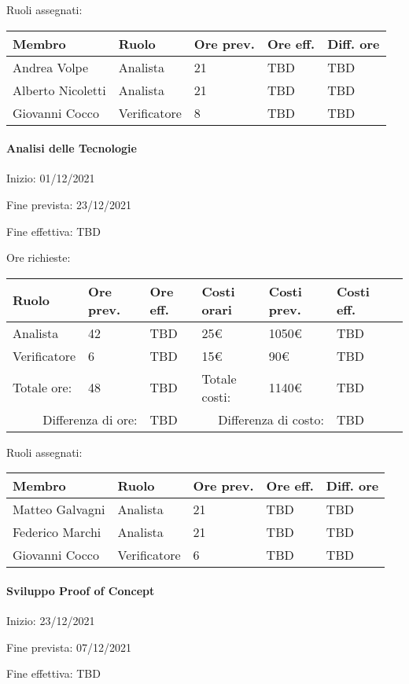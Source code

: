 \documentclass[a4paper, 12pt]{article}
\begin{document}
Ruoli assegnati:\\[0.5em]
\begin{tabular}{|l|l|l|l|l|}\hline
Membro & Ruolo & Ore prev. & Ore eff. & Diff. ore \\\hline
Andrea Volpe & Analista & 21 & TBD & TBD \\\hline
Alberto Nicoletti & Analista & 21 & TBD & TBD \\\hline
Giovanni Cocco & Verificatore & 8 & TBD & TBD \\\hline
\end{tabular}

\paragraph{Analisi delle Tecnologie}
Inizio: 01/12/2021\par
Fine prevista: 23/12/2021\par
Fine effettiva: TBD

Ore richieste:\\[0.5em]
\begin{tabular}{|l|l|l||l|l|l|l|}\hline
Ruolo & Ore prev. & Ore eff. & Costi orari & Costi prev. & Costi eff.\\\hline
Analista & 42 & TBD & 25\euro & 1050\euro & TBD \\\hline
Verificatore & 6 & TBD & 15\euro & 90\euro & TBD \\\hline
Totale ore: & 48 & TBD & Totale costi: & 1140\euro & TBD \\\hline
\multicolumn{2}{|r|}{Differenza di ore:} & TBD & \multicolumn{2}{r|}{Differenza di costo:} & TBD \\\hline
\end{tabular}

Ruoli assegnati:\\[0.5em]
\begin{tabular}{|l|l|l|l|l|}\hline
Membro & Ruolo & Ore prev. & Ore eff. & Diff. ore \\\hline
Matteo Galvagni & Analista & 21 & TBD & TBD \\\hline
Federico Marchi & Analista & 21 & TBD & TBD \\\hline
Giovanni Cocco & Verificatore & 6 & TBD & TBD \\\hline
\end{tabular}

\paragraph{Sviluppo Proof of Concept}
Inizio: 23/12/2021\par
Fine prevista: 07/12/2021\par
Fine effettiva: TBD
\end{document}
